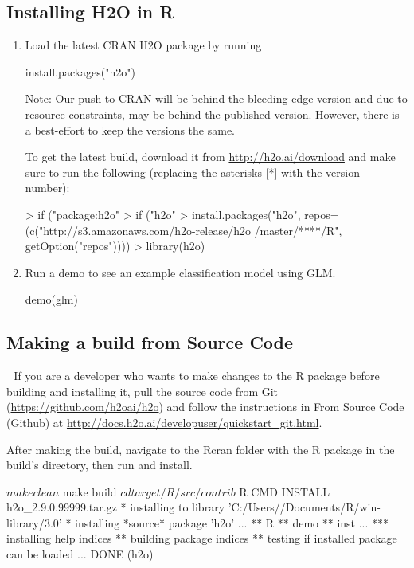 \documentclass[11pt]{article}
\begin{document}
\subsection{Installing H2O in R}
\begin{enumerate}
\item Load the latest CRAN H2O package by running \begin{spverbatim} install.packages("h2o") \end{spverbatim} 

Note: Our push to CRAN will be behind the bleeding edge version and due to resource constraints, may be behind the published version. However, there is a best-effort to keep the versions the same. 

To get the latest build, download it from \url{http://h2o.ai/download} and make sure to run the following (replacing the asterisks [*] with the version number): 
\begin{spverbatim}
> if ("package:h2o" %
> if ("h2o" %
> install.packages("h2o", repos=(c("http://s3.amazonaws.com/h2o-release/h2o
/master/****/R", getOption("repos"))))
> library(h2o)
\end{spverbatim}
\item Run a demo to see an example classification model using GLM. 
\begin{spverbatim}
demo(glm)
\end{spverbatim}
\end{enumerate}

\subsection{Making a build from Source Code} 
If you are a developer who wants to make changes to the R package before building and installing it, pull the source code from Git (\url{https://github.com/h2oai/h2o}) and follow the instructions in From Source Code (Github) at \url{http://docs.h2o.ai/developuser/quickstart\_git.html}.

After making the build, navigate to the Rcran folder with the R package in the build’s directory, then run and install.
\begin{spverbatim}
$ make clean
$ make build
$ cd target/R/src/contrib
$ R CMD INSTALL h2o_2.9.0.99999.tar.gz
* installing to library 'C:/Users//Documents/R/win-library/3.0'
* installing *source* package 'h2o' ...
** R
** demo
** inst
...
*** installing help indices
** building package indices
** testing if installed package can be loaded
...
DONE (h2o)
\end{spverbatim}
\end{document}
